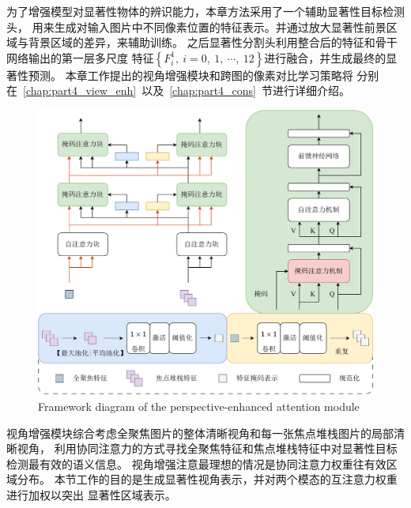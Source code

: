 为了增强模型对显著性物体的辨识能力，本章方法采用了一个辅助显著性目标检测头，
用来生成对输入图片中不同像素位置的特征表示。并通过放大显著性前景区域与背景区域的差异，来辅助训练。
之后显著性分割头利用整合后的特征和骨干网络输出的第一层多尺度
特征$\left \{ F_{i}^{1},~i=0,~1,~ \cdots, ~12 \right \}$进行融合，并生成最终的显著性预测。
%
%
%
%
%
%
本章工作提出的视角增强模块和跨图的像素对比学习策略将
分别在~\ref{chap:part4_view_enh}~以及~\ref{chap:part4_cons}~节进行详细介绍。









\label{chap:part4_view_enh}


\begin{figure}[!ht]
	\centering
	\includegraphics[width=0.95\linewidth]{figures/chapter4/view_enhance}
	{Framework diagram of the perspective-enhanced attention module}
	\label{cpt4_fig1:view_enhance}
\end{figure}



视角增强模块综合考虑全聚焦图片的整体清晰视角和每一张焦点堆栈图片的局部清晰视角，
利用协同注意力的方式寻找全聚焦特征和焦点堆栈特征中对显著性目标检测最有效的语义信息。
视角增强注意最理想的情况是协同注意力权重往有效区域分布。
本节工作的目的是生成显著性视角表示，并对两个模态的互注意力权重进行加权以突出
显著性区域表示。


